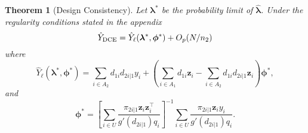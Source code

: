 \documentclass[12pt]{article}
\newtheorem{theorem}{Theorem}
\newcommand{\bx}{\mathbf{x}}
\renewcommand{\bf}[1]{\mathbf{#1}}
\begin{document}
\begin{theorem}[Design Consistency]\label{thm:dc1}
  Let $\bm \lambda^*$ be the probability limit of $\hat{\bm \lambda}$. 
  Under the regularity conditions stated in the appendix
  $$
  \hat Y_{\rm DCE} = \hat Y_\ell(\bm{\lambda}^*, \bm \phi^*) + O_p(N / n_2)
  $$
  where
  $$
  \hat Y_{\ell}(\bm \lambda^*, \bm \phi^*) = 
  \sum_{i \in A_2} d_{1i} d_{2i|1} y_i
  + \left(\sum_{i \in A_1} d_{1i} \bf z_i - 
  \sum_{i \in A_2} d_{1i} d_{2i|1} \bf{z}_i \right)\bm \phi^*,
  $$
  and
  $$
  \bm \phi^* = 
  \left[\sum_{i \in U} \frac{\pi_{2i|1}\bf z_i \bf z_i^\top}{g'(d_{2i|1})q_i}\right]^{-1}
  \sum_{i \in U} \frac{\pi_{2i|1}\bf z_i y_i}{g'(d_{2i|1})q_i}.
  $$

%

\end{theorem}
\end{document}
